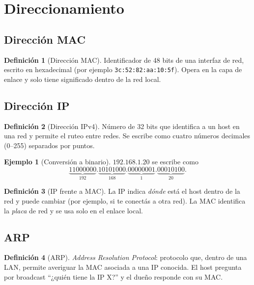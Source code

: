\documentclass[11pt,a4paper]{article}
\theoremstyle{definition}
\newtheorem{definicion}{Definición}[section]
\newtheorem{ejemplo}{Ejemplo}[section]
\theoremstyle{remark}
\begin{document}
\section{Direccionamiento}\label{sec:direccionamiento}

\subsection{Dirección MAC}

\begin{definicion}[Dirección MAC]
Identificador de 48 bits de una interfaz de red, escrito en hexadecimal (por ejemplo \texttt{3c:52:82:aa:10:5f}). Opera en la capa de enlace y solo tiene significado dentro de la red local.
\end{definicion}

\subsection{Dirección IP}

\begin{definicion}[Dirección IPv4]
Número de 32 bits que identifica a un host en una red y permite el ruteo entre redes. Se escribe como cuatro números decimales (0--255) separados por puntos.
\end{definicion}

\begin{ejemplo}[Conversión a binario]
$192.168.1.20$ se escribe como
\[
\underbrace{11000000}_{192}.\underbrace{10101000}_{168}.\underbrace{00000001}_{1}.\underbrace{00010100}_{20}.
\]
\end{ejemplo}

\begin{definicion}[IP frente a MAC]
La IP indica \emph{dónde} está el host dentro de la red y puede cambiar (por ejemplo, si te conectás a otra red). La MAC identifica la \emph{placa} de red y se usa solo en el enlace local.
\end{definicion}

\subsection{ARP}

\begin{definicion}[ARP]
\emph{Address Resolution Protocol}: protocolo que, dentro de una LAN, permite averiguar la MAC asociada a una IP conocida. El host pregunta por broadcast ``¿quién tiene la IP X?'' y el dueño responde con su MAC.
\end{definicion}
\end{document}
